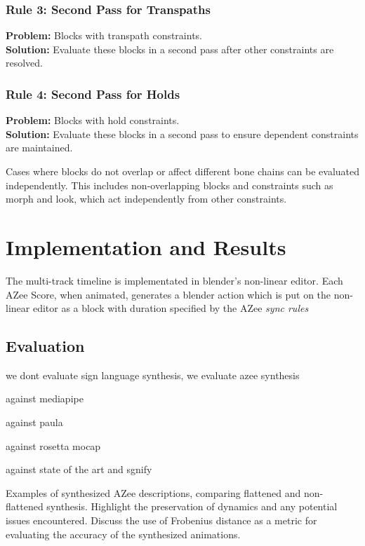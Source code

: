 \documentclass[../../main.tex]{subfiles}
\begin{document}
\subsubsection{Rule 3: Second Pass for Transpaths}
\textbf{Problem:} Blocks with transpath constraints.\\
\textbf{Solution:} Evaluate these blocks in a second pass after other constraints are resolved.

\subsubsection{Rule 4: Second Pass for Holds}
\textbf{Problem:} Blocks with hold constraints.\\
\textbf{Solution:} Evaluate these blocks in a second pass to ensure dependent constraints are maintained.

Cases where blocks do not overlap or affect different bone chains can be evaluated independently. This includes non-overlapping blocks and constraints such as morph and look, which act independently from other constraints.



\section{Implementation and Results}

The multi-track timeline is implementated in blender's non-linear editor. Each AZee Score, when animated, generates a blender action which is put on the non-linear editor as a block with duration specified by the AZee \emph{sync rules}

\subsection{Evaluation}

we dont evaluate sign language synthesis, we evaluate azee synthesis

against mediapipe 

against paula

against rosetta mocap

against state of the art and sgnify

Examples of synthesized AZee descriptions, comparing flattened and non-flattened synthesis. Highlight the preservation of dynamics and any potential issues encountered. Discuss the use of Frobenius distance as a metric for evaluating the accuracy of the synthesized animations.
\end{document}
